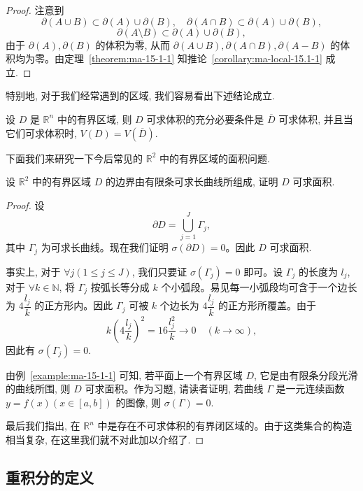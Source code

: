 \begin{proof}
注意到
\[
  \partial(A\cup B)\subset\partial(A)\cup\partial(B),\quad
  \partial(A\cap B)\subset\partial(A)\cup\partial(B),
\]
\[
  \partial(A\setminus B)\subset\partial(A)\cup\partial(B),
\]
由于 $\partial(A),\partial(B)$ 的体积为零, 从而 $\partial(A\cup B),\partial(A\cap B),\partial(A-B)$ 的体积均为零。由定理~\ref{theorem:ma-15-1-1} 知推论~\ref{corollary:ma-local-15.1-1} 成立.
\end{proof}


特别地, 对于我们经常遇到的区域, 我们容易看出下述结论成立.

\begin{corollary}\label{corollary:ma-local-15.1-2}
设 $D$ 是 $\mathbb R^n$ 中的有界区域, 则 $D$ 可求体积的充分必要条件是 $\overline D$ 可求体积, 并且当它们可求体积时, $V(D)=V(\overline D)$.
\end{corollary}

下面我们来研究一下今后常见的 $\mathbb R^2$ 中的有界区域的面积问题.

\begin{example}\label{example:ma-15-1-1}
设 $\mathbb R^2$ 中的有界区域 $D$ 的边界由有限条可求长曲线所组成, 证明 $D$ 可求面积.
\end{example}


\begin{proof}
设
\[
  \partial D=\bigcup_{j=1}^J\Gamma_j,
\]
其中 $\Gamma_j$ 为可求长曲线。现在我们证明 $\sigma(\partial D)=0$。因此 $D$ 可求面积.

事实上, 对于 $\forall j(1\leqslant j\leqslant J)$, 我们只要证 $\sigma(\Gamma_j)=0$ 即可。设 $\Gamma_j$ 的长度为 $l_j$, 对于 $\forall k\in\mathbb N$, 将 $\Gamma_j$ 按弧长等分成 $k$ 个小弧段。易见每一小弧段均可含于一个边长为 $4\dfrac{l_j}{k}$ 的正方形内。因此 $\Gamma_j$ 可被 $k$ 个边长为 $4\dfrac{l_j}{k}$ 的正方形所覆盖。由于
\[
  k\left(4\frac{l_j}{k}\right)^2=16\frac{l_j^2}{k}\to0\quad (k\to\infty),
\]
因此有 $\sigma(\Gamma_j)=0$.

由例~\ref{example:ma-15-1-1} 可知, 若平面上一个有界区域 $D$, 它是由有限条分段光滑的曲线所围, 则 $D$ 可求面积。作为习题, 请读者证明, 若曲线 $\Gamma$ 是一元连续函数 $y=f(x)(x\in[a,b])$ 的图像, 则 $\sigma(\Gamma)=0$.

最后我们指出, 在 $\mathbb R^n$ 中是存在不可求体积的有界闭区域的。由于这类集合的构造相当复杂, 在这里我们就不对此加以介绍了.
\end{proof}


\subsection{重积分的定义}
\label{subsec:ma-15-1-2}

